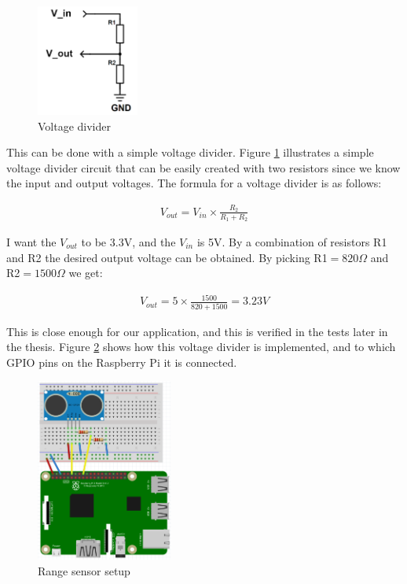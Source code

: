 \begin{figure}[h]
  \centering
  \includegraphics[width=0.3\textwidth]{fig/volt}
  \caption{Voltage divider}
  \label{fig:volt}
\end{figure}

This can be done with a simple voltage divider. Figure \ref{fig:volt} illustrates a simple voltage divider circuit that can be easily created with two resistors since we know the input and output voltages. The formula for a voltage divider is as follows:

\begin{align}
V_{out} = V_{in}\times \frac{R_2}{R_1 + R_2}
\end{align}

I want the $V_{out}$ to be 3.3V, and the $V_{in}$ is 5V. By a combination of resistors R1 and R2 the desired output voltage can be obtained. By picking R1$ = 820\Omega$ and R2$ = 1500\Omega$ we get:

\begin{align*}
V_{out} = 5 \times \frac{1500}{820+1500} = 3.23 V
\end{align*}

This is close enough for our application, and this is verified in the tests later in the thesis. Figure \ref{fig:rangesensor} shows how this voltage divider is implemented, and to which GPIO pins on the Raspberry Pi it is connected.

\begin{figure}[h]
  \centering
  \includegraphics[width=0.4\textwidth]{fig/SensorSketch}
  \caption{Range sensor setup}
  \label{fig:rangesensor}
\end{figure}
